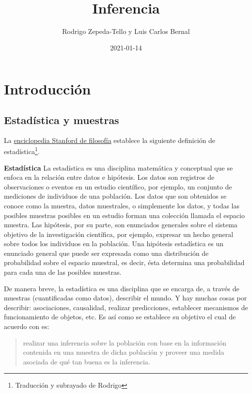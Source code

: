 \documentclass[
]{book}
\title{Inferencia}
\author{Rodrigo Zepeda-Tello y Luis Carlos Bernal}
\date{2021-01-14}
\newenvironment{Definicion}
{\begin{mdframed}[
  linecolor=definicioncolor,
  skipabove=12pt,
  skipbelow=12pt,
  roundcorner=20pt,
  splittopskip=2\topsep]}
{\end{mdframed}}
\begin{document}
\maketitle

{
\setcounter{tocdepth}{1}
\tableofcontents
}
\hypertarget{intro}{%
\chapter{Introducción}\label{intro}}

\hypertarget{estaduxedstica-y-muestras}{%
\section{Estadística y muestras}\label{estaduxedstica-y-muestras}}

La \href{https://plato.stanford.edu/entries/statistics/\#StaInd}{enciclopedia Stanford de filosofía} establece la siguiente definición de estadística\footnote{Traducción y subrayado de Rodrigo}.

\begin{Definicion}
\textbf{Estadística} La estadística es una disciplina matemática y
conceptual que se enfoca en la relación entre datos e hipótesis. Los
datos son registros de observaciones o eventos en un estudio científico,
por ejemplo, un conjunto de mediciones de individuos de una población.
Los datos que son obtenidos se conoce como la muestra, datos muestrales,
o simplemente los datos, y todas las posibles muestras posibles en un
estudio forman una colección llamada el espacio muestra. Las hipótesis,
por su parte, son enunciados generales sobre el sistema objetivo de la
investigación científica, por ejemplo, expresar un hecho general sobre
todos los individuos en la población. Una hipótesis estadística es un
enunciado general que puede ser expresada como una distribución de
probabilidad sobre el espacio muestral, es decir, ésta determina una
probabilidad para cada una de las posibles muestras.
\end{Definicion}

De manera breve, la estadística es una disciplina que se encarga de, a través de muestras (cuantificadas como datos), describir el mundo. Y hay muchas cosas por describir: asociaciones, causalidad, realizar predicciones, establecer mecanismos de funcionamiento de objetos, etc. Es así como se establece su objetivo el cual de acuerdo con \citet{wackerly} es:

\begin{quote}
realizar una inferencia sobre la población con base en la información contenida en una muestra de dicha población y proveer una medida asociada de qué tan buena es la inferencia.
\end{quote}
\end{document}
